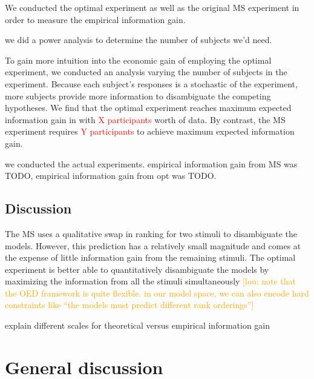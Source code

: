 \documentclass{article}
\newcommand{\red}[1]{\textcolor{Red}{#1}}
\newcommand{\lou}[1]{\textcolor{orange}{[lou: #1]}}
\newcommand{\cas}[1]{ \textsf{\color{darkgray} \scriptsize #1} }
\begin{document}

We conducted the optimal experiment as well as the original MS experiment in order to measure the empirical information gain.

\cas{we did a power analysis to determine the number of subjects we'd need.}

To gain more intuition into the economic gain of employing the optimal experiment, we conducted an analysis varying the number of subjects in the experiment. Because each subject's responses is a stochastic of the experiment, more subjects provide more information to disambiguate the competing hypotheses. We find that the optimal experiment reaches maximum expected information gain in with \red{X participants} worth of data. By contrast, the MS experiment requires \red{Y participants} to achieve maximum expected information gain.


\cas{we conducted the actual experiments. empirical information gain from MS was TODO, empirical information gain from opt was TODO.}

\subsection{Discussion}

The MS uses a qualitative swap in ranking for two stimuli to disambiguate the models.
However, this prediction has a relatively small magnitude and comes at the expense of little information gain from the remaining stimuli.
The optimal experiment is better able to quantitatively disambiguate the models by maximizing the information from all the stimuli simultaneously
\lou{note that the OED framework is quite flexible. in our model space, we can also encode hard constraints like ``the models must predict different rank orderings''}


\cas{explain different scales for theoretical versus empirical information gain}




\section{General discussion}
\end{document}
